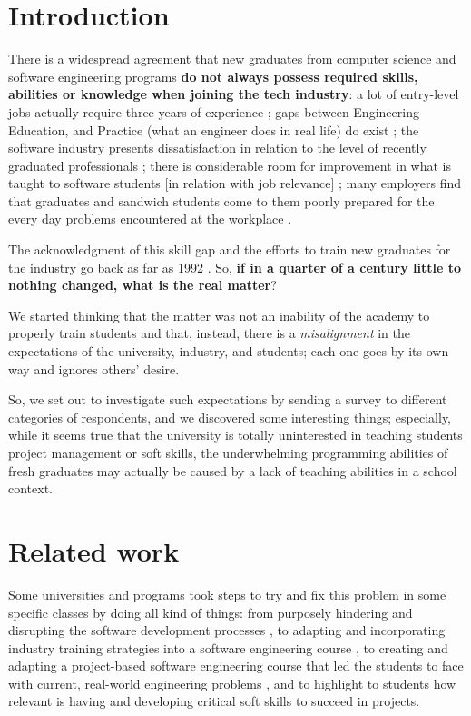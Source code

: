 \documentclass{sigchi}
\begin{document}
\section{Introduction}
There is a widespread agreement that new graduates from computer science and software engineering programs \textbf{do not always possess required skills, abilities or knowledge when joining the tech industry}: a lot of entry-level jobs actually require three years of experience \cite{Chakrabarti2018}; gaps between Engineering Education, and Practice (what an engineer does in real life) do exist \cite{Sivanesan2017}; the software industry presents dissatisfaction in relation to the level of recently graduated professionals \cite{Portela2017}; there is considerable room for improvement in what is taught to software students [in relation with job relevance] \cite{Lethbridgea}; many employers find that graduates and sandwich students come to them poorly prepared for the every day problems encountered at the workplace \cite{Dawson2000}.

The acknowledgment of this skill gap and the efforts to train new graduates for the industry go back as far as 1992 \cite{Dawson1992}. So, \textbf{if in a quarter of a century little to nothing changed, what is the real matter}?

We started thinking that the matter was not an inability of the academy to properly train students and that, instead, there is a \textit{misalignment} in the expectations of the university, industry, and students; each one goes by its own way and ignores others' desire.

So, we set out to investigate such expectations by sending a survey to different categories of respondents, and we discovered some interesting things; especially, while it seems true that the university is totally uninterested in teaching students project management or soft skills, the underwhelming programming abilities of fresh graduates may actually be caused by a lack of teaching abilities in a school context.

\section{Related work}
Some universities and programs took steps to try and fix this problem in some specific classes by doing all kind of things: from purposely hindering and disrupting the software development processes \cite{Dawson2000}, to adapting and incorporating industry training strategies into a software engineering course \cite{Portela2017}, to creating and adapting a project-based software engineering course that led the students to face with current, real-world engineering problems \cite{Delgado2017}, and to highlight to students how relevant is having and developing critical soft skills to succeed in projects\cite{Bastarrica2017}.
\end{document}
